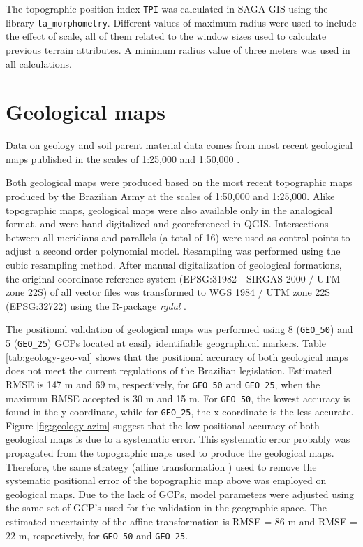 The topographic position index \texttt{TPI} was calculated in SAGA GIS using the library \texttt{ta\_morphometry}. Different values of maximum radius were used to include the effect of scale, all of them related to the window sizes used to calculate previous terrain attributes. A minimum radius value of three meters was used in all calculations.

\tocless\section{Geological maps}

Data on geology and soil parent material data comes from most recent geological maps published in the scales of 1:25,000 \cite{MacielFilho1990} and 1:50,000 \cite{GasparettoEtAl1988}.

Both geological maps were produced based on the most recent topographic maps produced by the Brazilian Army at the scales of 1:50,000 and 1:25,000. Alike topographic maps, geological maps were also available only in the analogical format, and were hand digitalized and georeferenced in QGIS. Intersections between all meridians and parallels (a total of 16) were used as control points to adjust a second order polynomial model. Resampling was performed using the cubic resampling method. After manual digitalization of geological formations, the original coordinate reference system (EPSG:31982 - SIRGAS 2000 / UTM zone 22S) of all vector files was transformed to WGS 1984 / UTM zone 22S (EPSG:32722) using the R-package \textit{rgdal} \cite{BivandEtAl2013a}.

The positional validation of geological maps was performed using 8 (\texttt{GEO\_50}) and 5 (\texttt{GEO\_25}) GCPs located at easily identifiable geographical markers. Table \ref{tab:geology-geo-val} shows that the positional accuracy of both geological maps does not meet the current regulations of the Brazilian legislation. Estimated RMSE is 147 m and 69 m, respectively, for \texttt{GEO\_50} and \texttt{GEO\_25}, when the maximum RMSE accepted is 30 m and 15 m. For \texttt{GEO\_50}, the lowest accuracy is found in the y coordinate, while for \texttt{GEO\_25}, the x coordinate is the less accurate. Figure \ref{fig:geology-azim} suggest that the low positional accuracy  of both geological maps is due to a systematic error. This systematic error probably was propagated from the topographic maps used to produce the geological maps. Therefore, the same strategy (affine transformation ) used to remove the systematic positional error of the topographic map above was employed on geological maps. Due to the lack of GCPs, model parameters were adjusted using the same set of GCP's used for the validation in the geographic space. The estimated uncertainty of the affine transformation is RMSE = 86 m and RMSE = 22 m, respectively, for \texttt{GEO\_50} and \texttt{GEO\_25}.

